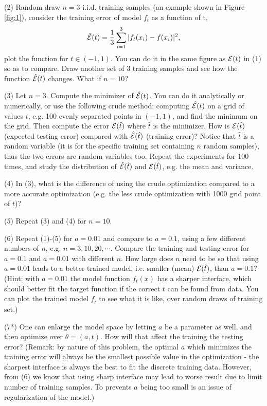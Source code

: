 \documentclass[english]{article}
\begin{document}
\begin{enumerate}
(2) Random draw $n=3$ i.i.d. training samples (an example shown in Figure \ref{fig:1}), consider the training error of model $f_t$ as a function of t,
\[
\hat{{\cal E}}(t ) = \frac{1}{3}\sum_{i=1}^3 |f_t(x_i)-f(x_i)|^2,
\]
plot the function for $t \in (-1,1)$. You can do it in the same figure as ${\cal E} (t )$  in (1) so as to compare.
Draw another set of $3$ training samples and see how the function $\hat{{\cal E}}(t )$ changes. 
What if $n=10$?

(3) Let $n=3$. Compute the minimizer of $\hat{{\cal E}}(t ) $. You can do it analytically or numerically, or use the following crude method: computing $\hat{{\cal E}}(t ) $ on a grid of values $t$, e.g. 100 evenly separated points in $(-1,1)$, and find the minimum on the grid. Then compute the error ${\cal E} (\hat{t} ) $ where $\hat{t}$ is the minimizer.
How is ${\cal E} (\hat{t} ) $  (expected testing error) compared with  $\hat{{\cal E}}(\hat{t}  ) $ (training error)?
Notice that $\hat{t}$ is a random variable (it is for the specific training set containing $n$ random samples), thus the two errors are random variables too.
Repeat the experiments for 100 times, and study the distribution of $\hat{{\cal E}}(\hat{t}  ) $  and ${\cal E} (\hat{t} ) $, e.g. the mean and variance.

(4) In (3), what is the difference of using the crude optimization compared to a more accurate optimization (e.g. the less crude optimization with 1000 grid point of $t$)?

(5) Repeat (3) and (4) for $n=10$.

(6) Repeat (1)-(5) for $a=0.01$ and compare to $a=0.1$, using a few different numbers of $n$, e.g. $n=3, 10, 20, \cdots$.
Compare the training and testing error for $a=0.1$ and $a=0.01$ with different $n$.
How large does $n$ need to be so that using $a=0.01$ leads to a better trained model, i.e. smaller (mean) ${\cal E}(\hat{t})$, than $a=0.1$?
(Hint: with $a=0.01$ the model function $f_t(x)$ has a sharper interface, which should better fit the target function if the correct $t$ can be found from data. You can plot the trained model $f_{\hat{t}}$ to see what it is like, over random draws of training set.) 

(7*) One can enlarge the model space by letting $a$ be a parameter as well, and then optimize over $\theta = (a,t)$. How will that affect the training the testing error? (Remark: by nature of this problem, the optimal $a$ which minimizes the training error will always be the smallest possible value in the optimization  - the sharpest interface is always the best to fit the discrete training data. However, from (6) we know that using sharp interface may lead to worse result due to limit number of training samples. To prevents $a$ being too small is an issue of regularization of the model.)


\end{enumerate}
\end{document}
